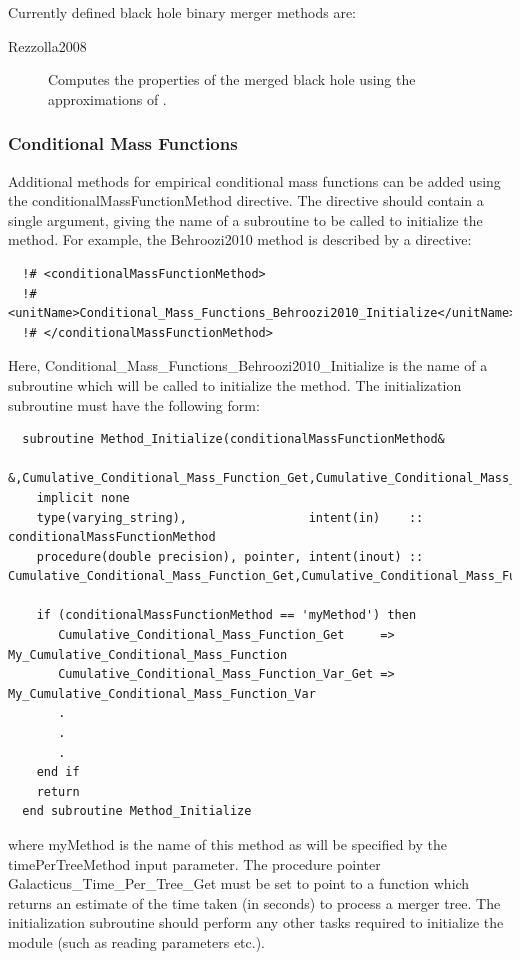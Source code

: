 Currently defined black hole binary merger methods are:
\begin{description}
 \item [{\normalfont \ttfamily Rezzolla2008}] Computes the properties of the merged black hole using the approximations of \cite{rezzolla_final_2008}.
\end{description}

\subsubsection{Conditional Mass Functions}

Additional methods for empirical conditional mass functions can be added using the {\normalfont \ttfamily conditionalMassFunctionMethod} directive. The directive should contain a single argument, giving the name of a subroutine to be called to initialize the method. For example, the {\normalfont \ttfamily Behroozi2010} method is described by a directive:
\begin{verbatim}
  !# <conditionalMassFunctionMethod>
  !#  <unitName>Conditional_Mass_Functions_Behroozi2010_Initialize</unitName>
  !# </conditionalMassFunctionMethod>
\end{verbatim}
Here, {\normalfont \ttfamily Conditional\_Mass\_Functions\_Behroozi2010\_Initialize} is the name of a subroutine which will be called to initialize the method. The initialization subroutine must have the following form:
\begin{verbatim}
  subroutine Method_Initialize(conditionalMassFunctionMethod&
       &,Cumulative_Conditional_Mass_Function_Get,Cumulative_Conditional_Mass_Function_Var_Get)
    implicit none
    type(varying_string),                 intent(in)    :: conditionalMassFunctionMethod
    procedure(double precision), pointer, intent(inout) :: Cumulative_Conditional_Mass_Function_Get,Cumulative_Conditional_Mass_Function_Var_Get
    
    if (conditionalMassFunctionMethod == 'myMethod') then
       Cumulative_Conditional_Mass_Function_Get     => My_Cumulative_Conditional_Mass_Function
       Cumulative_Conditional_Mass_Function_Var_Get => My_Cumulative_Conditional_Mass_Function_Var
       .
       .
       .
    end if
    return
  end subroutine Method_Initialize
\end{verbatim}
where {\normalfont \ttfamily myMethod} is the name of this method as will be specified by the {\normalfont \ttfamily timePerTreeMethod} input parameter. The procedure pointer {\normalfont \ttfamily Galacticus\_Time\_Per\_Tree\_Get} must be set to point to a function which returns an estimate of the time taken (in seconds) to process a merger tree. The initialization subroutine should perform any other tasks required to initialize the module (such as reading parameters etc.).

